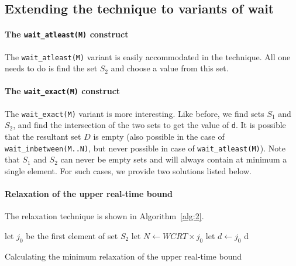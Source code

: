 \subsection{Extending the technique to variants of wait}
\label{sec:extend-tehcn-vari}

\paragraph{The \texttt{wait\_atleast(M)} construct}
\label{sec:extend-techn-vari}

The \texttt{wait\_atleast(M)} variant is easily accommodated in the
technique. All one needs to do is find the set $S_2$ and choose a value
from this set.

\paragraph{The \texttt{wait\_exact(M)} construct}
\label{sec:extend-techn-vari}

The \texttt{wait\_exact(M)} variant is more interesting. Like before,
we find sets $S_1$ and $S_2$, and find the intersection of the two sets
to get the value of \texttt{d}. It is possible %
that the resultant set $D$ is empty (also possible in the case of
\texttt{wait\_inbetween(M..N)}, but never possible in case of
\texttt{wait\_atleast(M)}). Note that $S_1$ and $S_2$ can never be empty
sets and will always contain at minimum a single element. For such
cases, we provide two solutions listed below.


\paragraph{Relaxation of the upper real-time bound}
\label{sec:over-appr-relax}

The relaxation technique is shown in Algorithm~\ref{alg:2}.
  
\begin{algorithm}[t!]
  \begin{minipage}{1.0\linewidth}
    \SetAlgoLined
     {
      let $j_{0}$ be the first element of set $S_2$\;
      \ShowLn let $N \leftarrow WCRT \times j_0$\;
      let $d \leftarrow j_0$\;
    }
    \Return d\;
    \caption{Calculating the minimum relaxation of the upper real-time
      bound}
    \label{alg:2}
  \end{minipage}
\end{algorithm}



